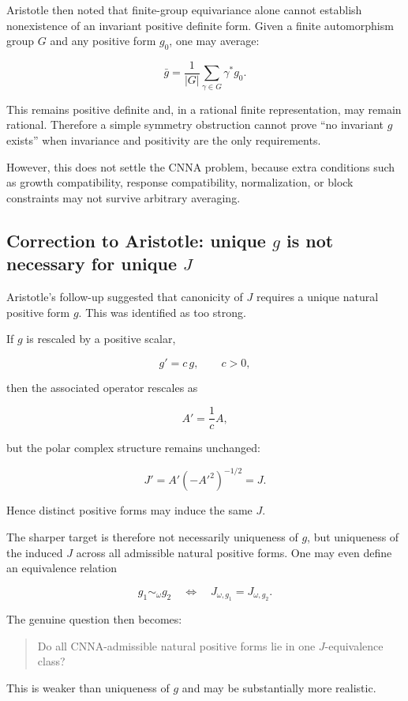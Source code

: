 \documentclass[11pt,a4paper]{article}
\begin{document}
Aristotle then noted that finite-group equivariance alone cannot establish nonexistence of an invariant positive definite form. Given a finite automorphism group $G$ and any positive form $g_{0}$, one may average:

\[
\bar g
=
\frac{1}{|G|}\sum_{\gamma\in G}\gamma^{*}g_{0}.
\]

This remains positive definite and, in a rational finite representation, may remain rational. Therefore a simple symmetry obstruction cannot prove ``no invariant $g$ exists'' when invariance and positivity are the only requirements.

However, this does not settle the CNNA problem, because extra conditions such as growth compatibility, response compatibility, normalization, or block constraints may not survive arbitrary averaging.

\subsection{Correction to Aristotle: unique $g$ is not necessary for unique $J$}

Aristotle's follow-up suggested that canonicity of $J$ requires a unique natural positive form $g$. This was identified as too strong.

If $g$ is rescaled by a positive scalar,

\[
g'=c\,g,\qquad c>0,
\]

then the associated operator rescales as

\[
A'=\frac{1}{c}A,
\]

but the polar complex structure remains unchanged:

\[
J'
=A'(-A'^2)^{-1/2}
=J.
\]

Hence distinct positive forms may induce the same $J$.

The sharper target is therefore not necessarily uniqueness of $g$, but uniqueness of the induced $J$ across all admissible natural positive forms. One may even define an equivalence relation

\[
g_{1}\sim_{\omega}g_{2}
\quad\Longleftrightarrow\quad
J_{\omega,g_{1}}=J_{\omega,g_{2}}.
\]

The genuine question then becomes:

\begin{quote}
Do all CNNA-admissible natural positive forms lie in one $J$-equivalence class?
\end{quote}

This is weaker than uniqueness of $g$ and may be substantially more realistic.
\end{document}
